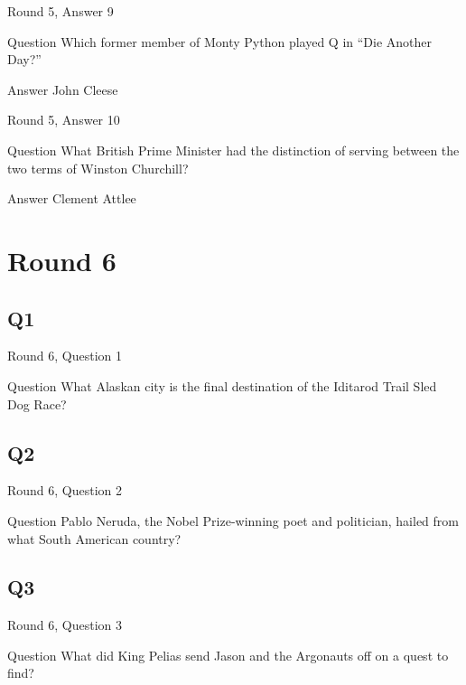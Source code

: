 \documentclass[11pt]{beamer}
\begin{document}
\begin{frame}[t]{Round 5, Answer 9}
\vspace{2em}
\begin{block}{Question}
Which former member of Monty Python played Q in ``Die Another Day?''
\end{block}
\pause{}
\begin{block}{Answer}
John Cleese
\end{block}
\end{frame}
    

\begin{frame}[t]{Round 5, Answer 10}
\vspace{2em}
\begin{block}{Question}
What British Prime Minister had the distinction of serving between the two terms of Winston Churchill\@?
\end{block}
\pause{}
\begin{block}{Answer}
Clement Attlee
\end{block}
\end{frame}
    

\section{Round 6}
    

\subsection*{Q1}
\begin{frame}[t]{Round 6, Question 1}
\vspace{2em}
\begin{block}{Question}
What Alaskan city is the final destination of the Iditarod Trail Sled Dog Race\@?
\end{block}
\end{frame}
    

\subsection*{Q2}
\begin{frame}[t]{Round 6, Question 2}
\vspace{2em}
\begin{block}{Question}
Pablo Neruda, the Nobel Prize-winning poet and politician, hailed from what South American country\@?
\end{block}
\end{frame}
    

\subsection*{Q3}
\begin{frame}[t]{Round 6, Question 3}
\vspace{2em}
\begin{block}{Question}
What did King Pelias send Jason and the Argonauts off on a quest to find\@?
\end{block}
\end{frame}
    
\end{document}

